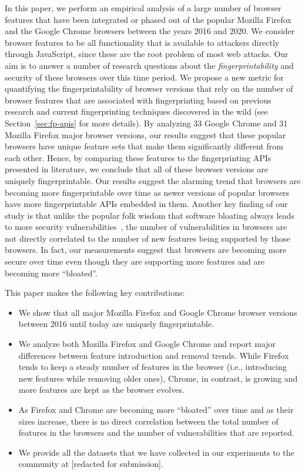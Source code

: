In this paper, we perform an empirical analysis of a large number of
browser features that have been integrated or phased out of the
popular Mozilla Firefox and the Google Chrome browsers between the
years 2016 and 2020. We consider browser features to be all
functionality that is available to attackers directly through
JavaScript, since these are the root problem of most web attacks. Our
aim is to answer a number of research questions about the
\textit{fingerprintability} and security of these browsers over this
time period. We propose a new metric for quantifying the
fingerprintability of browser versions that rely on the number of
browser features that are associated with fingerprinting based on
previous research and current fingerprinting techniques discovered in
the wild (see Section~\ref{sec:fp-apis} for more details). By
analyzing 33 Google Chrome and 31 Mozilla Firefox major browser
versions, our results suggest that these popular browsers have unique
feature sets that make them significantly different from each
other. Hence, by comparing these features to the fingerprinting APIs
presented in literature, we conclude that all of these browser
versions are uniquely fingerprintable. Our results suggest the
alarming trend that browsers are becoming more fingerprintable over
time as newer versions of popular browsers have more fingerprintable
APIs embedded in them. Another key finding of our study is that unlike
the popular folk wisdom that software bloating always leads to more
security vulnerabilities~\cite{Bloating}, the number of
vulnerabilities in browsers are not directly correlated to the number
of new features being supported by those browsers. In fact, our
measurements suggest that browsers are becoming more secure over time
even though they are supporting more features and are becoming more
``bloated''.

This paper makes the following key contributions:

\begin{itemize}

\item We show that all major Mozilla Firefox and Google Chrome browser
  versions between 2016 until today are uniquely fingerprintable.

\item We analyze both Mozilla Firefox and Google Chrome and report
  major differences between feature introduction and removal
  trends. While Firefox tends to keep a steady number of features in
  the browser (i.e., introducing new features while removing older
  ones), Chrome, in contrast, is growing and more features are kept as
  the browser evolves.

\item As Firefox and Chrome are becoming more ``bloated'' over time
  and as their sizes increase, there is no direct correlation between
  the total number of features in the browsers and the number of
  vulnerabilities that are reported.

\item We provide all the datasets that we have collected in our
  experiments to the community at [redacted for submission].
  
\end{itemize}

